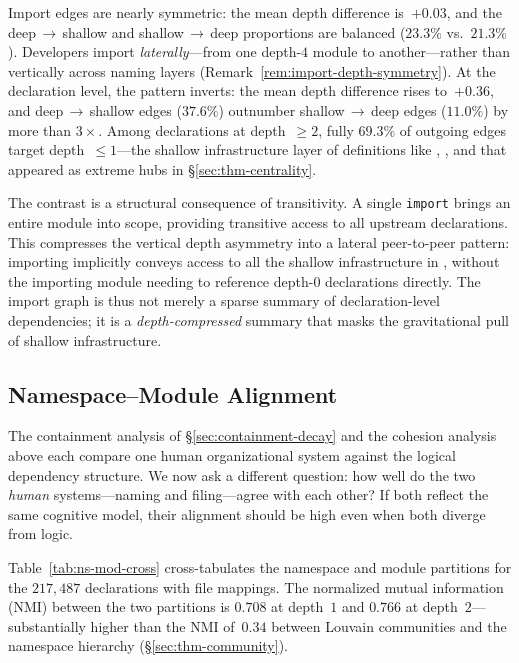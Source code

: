 Import edges are nearly symmetric: the mean depth difference is~$+0.03$, and the deep$\,\to\,$shallow and shallow$\,\to\,$deep proportions are balanced ($23.3\%$ vs.\ $21.3\%$). Developers import \emph{laterally}---from one depth-$4$ module to another---rather than vertically across naming layers (Remark~\ref{rem:import-depth-symmetry}). At the declaration level, the pattern inverts: the mean depth difference rises to~$+0.36$, and deep$\,\to\,$shallow edges ($37.6\%$) outnumber shallow$\,\to\,$deep edges ($11.0\%$) by more than $3{\times}$. Among declarations at depth~$\ge 2$, fully $69.3\%$ of outgoing edges target depth~$\le 1$---the shallow infrastructure layer of definitions like , , and  that appeared as extreme hubs in \S\ref{sec:thm-centrality}.

The contrast is a structural consequence of transitivity. A single \texttt{import} brings an entire module into scope, providing transitive access to all upstream declarations. This compresses the vertical depth asymmetry into a lateral peer-to-peer pattern: importing  implicitly conveys access to all the shallow infrastructure in , without the importing module needing to reference depth-$0$ declarations directly. The import graph is thus not merely a sparse summary of declaration-level dependencies; it is a \emph{depth-compressed} summary that masks the gravitational pull of shallow infrastructure.

\subsection{Namespace--Module Alignment}
\label{sec:ns-mod-cross}

The containment analysis of \S\ref{sec:containment-decay} and the cohesion analysis above each compare one human organizational system against the logical dependency structure. We now ask a different question: how well do the two \emph{human} systems---naming and filing---agree with each other? If both reflect the same cognitive model, their alignment should be high even when both diverge from logic.

Table~\ref{tab:ns-mod-cross} cross-tabulates the namespace and module partitions for the $217{,}487$ declarations with file mappings. The normalized mutual information (NMI) between the two partitions is $0.708$ at depth~$1$ and $0.766$ at depth~$2$---substantially higher than the NMI of~$0.34$ between Louvain communities and the namespace hierarchy (\S\ref{sec:thm-community}).

